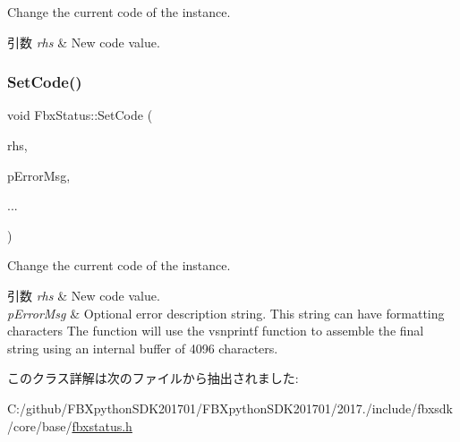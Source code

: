 Change the current code of the instance. 
\begin{DoxyParams}{引数}
{\em rhs} & New code value. \\
\hline
\end{DoxyParams}
\mbox{\label{class_fbx_status_a6991ae689fa0c9f5f72449f531772deb}} 
\subsubsection{\texorpdfstring{Set\+Code()}{SetCode()}\hspace{0.1cm}{\footnotesize\ttfamily [2/2]}}
{\footnotesize\ttfamily void Fbx\+Status\+::\+Set\+Code (\begin{DoxyParamCaption}\item[{const \hyperlink{class_fbx_status_a6a631d5d95b28e31a19aabd5f5809ecc}{E\+Status\+Code}}]{rhs,  }\item[{const char $\ast$}]{p\+Error\+Msg,  }\item[{}]{... }\end{DoxyParamCaption})}

Change the current code of the instance. 
\begin{DoxyParams}{引数}
{\em rhs} & New code value. \\
\hline
{\em p\+Error\+Msg} & Optional error description string. This string can have formatting characters The function will use the vsnprintf function to assemble the final string using an internal buffer of 4096 characters. \\
\hline
\end{DoxyParams}


このクラス詳解は次のファイルから抽出されました\+:\begin{DoxyCompactItemize}
\item 
C\+:/github/\+F\+B\+Xpython\+S\+D\+K201701/\+F\+B\+Xpython\+S\+D\+K201701/2017./include/fbxsdk/core/base/\hyperlink{fbxstatus_8h}{fbxstatus.\+h}\end{DoxyCompactItemize}
